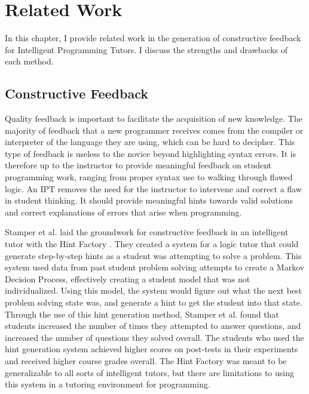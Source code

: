 
\renewcommand{\thechapter}{3}
\chapter{Related Work}
In this chapter, I provide related work in the generation of constructive feedback for Intelligent Programming Tutors. I discuss the strengths and drawbacks of each method.

\section{Constructive Feedback}

Quality feedback is important to facilitate the acquisition of new knowledge. The majority of feedback that a new programmer receives comes from the compiler or interpreter of the language they are using, which can be hard to decipher. This type of feedback is useless to the novice beyond highlighting syntax errors. It is therefore up to the instructor to provide meaningful feedback on student programming work, ranging from proper syntax use to walking through flawed logic. An IPT removes the need for the instructor to intervene and correct a flaw in student thinking. It should provide meaningful hints towards valid solutions and correct explanations of errors that arise when programming.

Stamper et al. laid the groundwork for constructive feedback in an intelligent tutor with the Hint Factory \cite{Stamper2013}. They created a system for a logic tutor that could generate step-by-step hints as a student was attempting to solve a problem. This system used data from past student problem solving attempts to create a Markov Decision Process, effectively creating a student model that was not individualized. Using this model, the system would figure out what the next best problem solving state was, and generate a hint to get the student into that state. Through the use of this hint generation method, Stamper et al. found that students increased the number of times they attempted to answer questions, and increased the number of questions they solved overall. The students who used the hint generation system achieved higher scores on post-tests in their experiments and received higher course grades overall. The Hint Factory was meant to be generalizable to all sorts of intelligent tutors, but there are limitations to using this system in a tutoring environment for programming.

